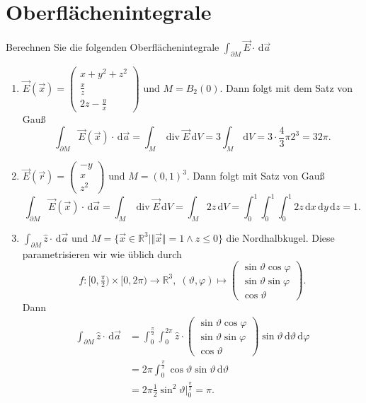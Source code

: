 \documentclass[11pt]{article}
\theoremstyle{plain}
\theoremstyle{definition}
\theoremstyle{remark}
\newcommand{\R}{\mathbb{R}}
\renewcommand{\d}{\,\mathrm{d}}
\newcommand{\ph}{\varphi}
\renewcommand{\th}{\vartheta}
\renewcommand{\div}{\operatorname{div}}
\begin{document}
\section{Oberflächenintegrale}
Berechnen Sie die folgenden Oberflächenintegrale $\int_{\partial M} \vec E \cdot \d \vec a$

\begin{enumerate}[label = \alph*)]
\item $\vec E(\vec x) = \begin{pmatrix} x + y^2 + z^2 \\ \frac{x}{z} \\ 2z - \frac{y}{x} \end{pmatrix}$ und $M = B_2(0)$. Dann folgt mit dem Satz von Gauß
\[ \int_{\partial M} \vec E(\vec x) \cdot \d\vec a = \int_M \div \vec E \d V = 3 \int_M \d V = 3\cdot\frac{4}{3} \pi 2^3 = 32\pi. \]

\item $\vec E(\vec r) = \begin{pmatrix} -y \\ x \\ z^2 \end{pmatrix}$ und $M = (0,1)^3$. Dann folgt mit Satz von Gauß
\[ \int_{\partial M} \vec E(\vec x) \cdot \d\vec a = \int_M \div \vec E \d V = \int_M 2z \d V = \int_0^1 \int_0^1 \int_0^1 2z \d x \d y \d z = 1. \]

\item $\int_{\partial M} \hat z \cdot \d \vec a$ und $M = \{ \vec x \in \R^3 \mid \Vert \vec x \Vert = 1 \land z \leq 0 \}$ die Nordhalbkugel. Diese parametrisieren wir wie üblich durch 
\[ f: [0, \tfrac{\pi}{2}) \times [0, 2\pi) \longrightarrow \R^3, \; (\th, \ph) \longmapsto \begin{pmatrix}
\sin\th \cos\ph \\ \sin\th \sin \ph \\ \cos\th
\end{pmatrix}. \]
Dann
\begin{align*} \int_{\partial M} \hat z \cdot \d \vec a &= \int_0^{\frac{\pi}{2}} \int_0^{2\pi}  \hat z \cdot 
\begin{pmatrix}
\sin\th \cos\ph \\ \sin\th \sin \ph \\ \cos\th 
\end{pmatrix} 
\sin\th \d\th \d\ph \\
&= 2\pi \int_0^{\frac{\pi}{2}} \cos\th \sin\th \d\th \\
&= 2\pi \tfrac{1}{2} \sin^2 \th\big\vert_0^{\frac{\pi}{2}} = \pi.
\end{align*}
\end{enumerate}

\end{document}
